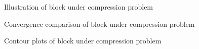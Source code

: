 \begin{figure}[!ht]
\centering
\caption{Illustration of block under compression problem}\label{block_illsutration}
\end{figure}

\begin{figure}[!ht]
\centering
\caption{Convergence comparison of block under compression problem}\label{block_convergence}
\end{figure}

\begin{figure}[!ht]
\centering
\caption{Contour plots of block under compression problem}\label{block_contour}
\end{figure}

